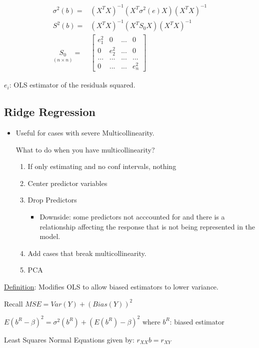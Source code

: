 \documentclass[11pt]{article}
\begin{document}
\begin{equation}
\begin{split}
\sigma^2(b) = & (X^T X)^{-1}(X^T \sigma^2(e) X)(X^T X)^{-1}\\
S^2(b) = & (X^T X)^{-1}(X^T S_0 X)(X^T X)^{-1}\\
\underset{(n \times n)}{S_0} = & \begin{bmatrix}
e_1^2 & 0 & ... & 0\\
0 & e_2^2 & ... & 0\\
... & ... & ... & ...\\
0 & ... & ... & e_n^2
\end{bmatrix}
\end{split}
\end{equation}

\(e_i\): OLS estimator of the residuals squared.
\subsection{Ridge Regression}
\label{sec:org3386fb6}
\begin{itemize}
\item Useful for cases with severe Multicollinearity.

What to do when you have multicollinearity?
\begin{enumerate}
\item If only estimating and no conf intervals, nothing
\item Center predictor variables
\item Drop Predictors
\begin{itemize}
\item Downside: some predictors not acccounted for and there is a relationship
affecting the response that is not being represented in the model.
\end{itemize}
\item Add cases that break multicollinearity.
\item PCA
\end{enumerate}
\end{itemize}

\uline{Definition}: Modifies OLS to allow biased estimators to lower variance.

Recall \(MSE = Var(Y) + (Bias(Y))^2\)

\(E(b^R - \beta)^2 = \sigma^2(b^R) + (E(b^R) - \beta)^2\) where \(b^R\): biased estimator

Least Squares Normal Equations given by: \(r_{XX} b = r_{XY}\)
\end{document}
